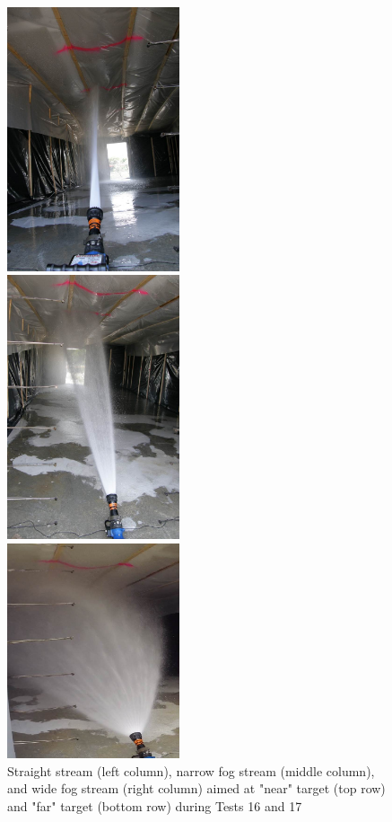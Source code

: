 \documentclass[12pt,oneside]{book}
\begin{document}
\begin{figure}[!ht]
\begin{center}
\end{center}
\endminipage \hfill
\vspace{0.15in}
\minipage{2.15in}
\begin{center}
	\includegraphics[width=2in]{../Pictures/SS_far}
\end{center} 
\endminipage \hfill
\minipage{2.15in}
\begin{center}
	\includegraphics[width=2in]{../Pictures/NF_far}
\end{center}
\endminipage \hfill
\minipage{2.15in}
\begin{center}
	\includegraphics[width=2in]{../Pictures/WF_far}
\end{center}
\endminipage \hfill
\caption[Straight Stream, Narrow Fog Stream, and Wide Fog Stream during Tests 16 and 17]{Straight stream (left column), narrow fog stream (middle column), and wide fog stream (right column) aimed at "near" target (top row) and "far" target (bottom row) during Tests 16 and 17}
\label{fig:test_16_17_pic}
\end{figure}
\end{document}
